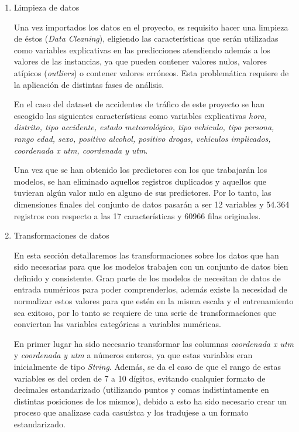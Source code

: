             \begin{enumerate}

                \item Limpieza de datos

                    Una vez importados los datos en el proyecto, es requisito hacer una limpieza de éstos (\textit{Data Cleaning}), eligiendo las características que serán utilizadas como variables explicativas en las predicciones atendiendo además a los valores de las instancias, ya que pueden contener valores nulos, valores atípicos (\textit{outliers}) o contener valores erróneos. Esta problemática requiere de la aplicación de distintas fases de análisis.

                    En el caso del dataset de accidentes de tráfico de este proyecto se han escogido las siguientes características como variables explicativas \textit{hora, distrito, tipo accidente, estado meteorológico, tipo vehiculo, tipo persona, rango edad, sexo, positivo alcohol, positivo drogas, vehiculos implicados, coordenada x utm, coordenada y utm}.


                    Una vez que se han obtenido los predictores con los que trabajarán los modelos, se han eliminado aquellos registros duplicados y aquellos que tuvieran algún valor nulo en alguno de sus predictores. Por lo tanto, las dimensiones finales del conjunto de datos pasarán a ser 12 variables y 54.364 registros con respecto a las 17 características y 60966 filas originales. 

                \item Transformaciones de datos

                    En esta sección detallaremos las transformaciones sobre los datos que han sido necesarias para que los modelos trabajen con un conjunto de datos bien definido y consistente. Gran parte de los modelos de  necesitan de datos de entrada numéricos para poder comprenderlos, además existe la necesidad de normalizar estos valores para que estén en la misma escala y el entrenamiento sea exitoso, por lo tanto se requiere de una serie de transformacíones que conviertan las variables categóricas a variables numéricas.

                    En primer lugar ha sido necesario transformar las columnas \textit{coordenada x utm} y \textit{coordenada y utm} a números enteros, ya que estas variables eran inicialmente de tipo \textit{String}. Además, se da el caso de que el rango de estas variables es del orden de 7 a 10 dígitos, evitando cualquier formato de decimales estandarizado (utilizando puntos y comas indistintamente en distintas posiciones de los mismos), debido a esto ha sido necesario crear un proceso que analizase cada casuístca y los tradujese a un formato estandarizado.


\end{enumerate}
